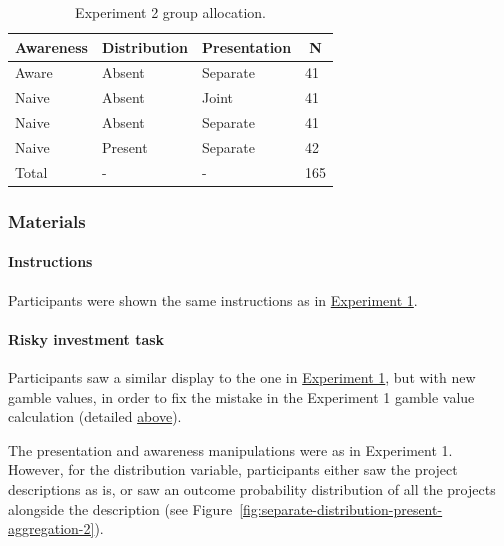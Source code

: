 \documentclass[a4paper, nobind, dvipsnames]{templates/ociamthesis}
\theoremstyle{definition}
\theoremstyle{definition}
\theoremstyle{definition}
\theoremstyle{definition}
\theoremstyle{remark}
\begin{document}
\begin{table}[tbp]

\begin{center}
\begin{threeparttable}

\caption{\label{tab:condition-allocation-aggregation-2}Experiment 2 group allocation.}

\begin{tabular}{llll}
\toprule
Awareness & \multicolumn{1}{c}{Distribution} & \multicolumn{1}{c}{Presentation} & \multicolumn{1}{c}{N}\\
\midrule
Aware & Absent & Separate & 41\\
Naive & Absent & Joint & 41\\
Naive & Absent & Separate & 41\\
Naive & Present & Separate & 42\\
Total & - & - & 165\\
\bottomrule
\end{tabular}

\end{threeparttable}
\end{center}

\end{table}

\subsubsection{Materials}

\paragraph{Instructions}

Participants were shown the same instructions as in
\protect\hyperlink{instructions-materials-aggregation-1}{Experiment 1}.

\hypertarget{task-aggregation-2}{%
\paragraph{Risky investment task}\label{task-aggregation-2}}

Participants saw a similar display to the one in
\protect\hyperlink{task-aggregation-1}{Experiment 1}, but with new gamble values, in order to fix
the mistake in the Experiment 1 gamble value calculation (detailed
\protect\hyperlink{outcome-distribution-aggregation-1}{above}).

The presentation and awareness manipulations were as in Experiment 1. However,
for the distribution variable, participants either saw the project descriptions
as is, or saw an outcome probability distribution of all the projects alongside
the description (see
Figure~\ref{fig:separate-distribution-present-aggregation-2}).
\end{document}
